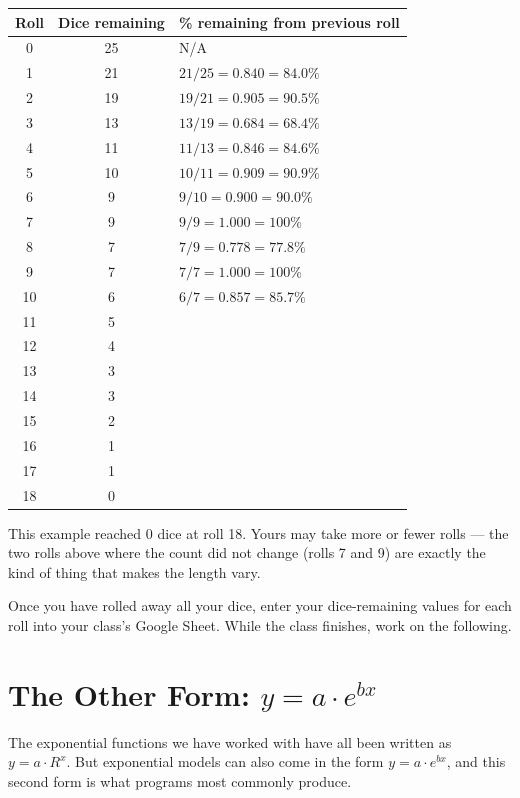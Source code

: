 \documentclass[12pt]{ximera}
\begin{document}
\begin{center}
\begin{tabular}{ccl}
\hline
Roll & Dice remaining & \% remaining from previous roll \\
\hline
0  & 25 & N/A \\
1  & 21 & $21/25 = 0.840 = 84.0\%$ \\
2  & 19 & $19/21 = 0.905 = 90.5\%$ \\
3  & 13 & $13/19 = 0.684 = 68.4\%$ \\
4  & 11 & $11/13 = 0.846 = 84.6\%$ \\
5  & 10 & $10/11 = 0.909 = 90.9\%$ \\
6  & 9  & $9/10 = 0.900 = 90.0\%$ \\
7  & 9  & $9/9 = 1.000 = 100\%$ \\
8  & 7  & $7/9 = 0.778 = 77.8\%$ \\
9  & 7  & $7/7 = 1.000 = 100\%$ \\
10 & 6  & $6/7 = 0.857 = 85.7\%$ \\
11 & 5  & \\
12 & 4  & \\
13 & 3  & \\
14 & 3  & \\
15 & 2  & \\
16 & 1  & \\
17 & 1  & \\
18 & 0  & \\
\hline
\end{tabular}
\end{center}

This example reached 0 dice at roll 18. Yours may take more or fewer rolls --- the two
rolls above where the count did not change (rolls 7 and 9) are exactly the kind of thing
that makes the length vary.

Once you have rolled away all your dice, enter your dice-remaining values for each roll
into your class's Google Sheet. While the class finishes, work on the following.

\section*{The Other Form: $y = a \cdot e^{bx}$}

The exponential functions we have worked with have all been written as $y = a \cdot R^x$.
But exponential models can also come in the form $y = a \cdot e^{bx}$, and this second
form is what programs most commonly produce.
\end{document}
